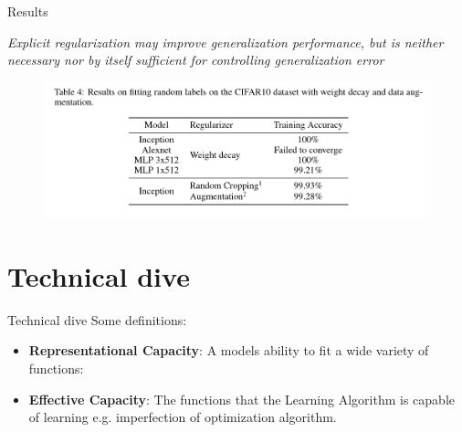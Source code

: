 \documentclass[10pt]{beamer}
\begin{document}
\begin{frame}{Results}
	\begin{center}
			\emph{Explicit regularization may improve generalization performance, but is neither necessary nor by itself sufficient for controlling generalization error}
	\end{center}

	\begin{figure}
		\centering
		\centering
		\includegraphics[width=\linewidth]{fig2c}
		\label{fig:withreg}
	\end{figure}
\end{frame}

\section{Technical dive}

\begin{frame}{Technical dive }
	Some definitions:
	\begin{itemize}
		\item \textbf{Representational Capacity}: A models ability to fit a wide variety of functions:
		\item \textbf{Effective Capacity}: The functions that the Learning Algorithm is capable of learning e.g. imperfection of optimization algorithm.
	\end{itemize}
\end{frame}	
\end{document}
